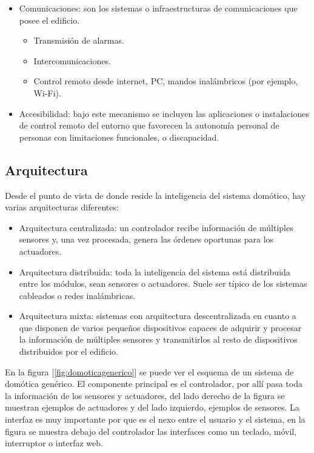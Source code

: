 \begin{itemize}
\begin{itemize}
\end{itemize}
\item Comunicaciones: son los sistemas o infraestructuras de comunicaciones que posee el edificio.
\begin{itemize}
\item Transmisión de alarmas.
\item Intercomunicaciones.
\item Control remoto desde internet, PC, mandos inalámbricos (por ejemplo, Wi-Fi).
\end{itemize}
\item Accesibilidad: bajo este mecanismo se incluyen las aplicaciones o instalaciones de control remoto del entorno que favorecen la autonomía personal de personas con limitaciones funcionales, o discapacidad.
\end{itemize}

\subsection{Arquitectura}
\label{sec:arquitecturadedomotica}

Desde el punto de vista de donde reside la inteligencia del sistema domótico, hay varias arquitecturas diferentes:

\begin{itemize}
\item Arquitectura centralizada: un controlador recibe información de múltiples sensores y, una vez procesada, genera las órdenes oportunas para los actuadores.
\item Arquitectura distribuida: toda la inteligencia del sistema está distribuida entre los módulos, sean sensores o actuadores. Suele ser típico de los sistemas cableados o redes inalámbricas.
\item Arquitectura mixta: sistemas con arquitectura descentralizada en cuanto a que disponen de varios pequeños dispositivos capaces de adquirir y procesar la información de múltiples sensores y transmitirlos al resto de dispositivos distribuidos por el edificio.
\end{itemize}

En la figura [\ref{fig:domoticagenerico}] se puede ver el esquema de un sistema de domótica genérico. El componente principal es el controlador, por allí pasa toda la información de los sensores y actuadores, del lado derecho de la figura se muestran ejemplos de actuadores y del lado izquierdo, ejemplos de sensores. La interfaz es muy importante por que es el nexo entre el usuario y el sistema, en la figura se muestra debajo del controlador las interfaces como un teclado, móvil, interruptor o interfaz web.

